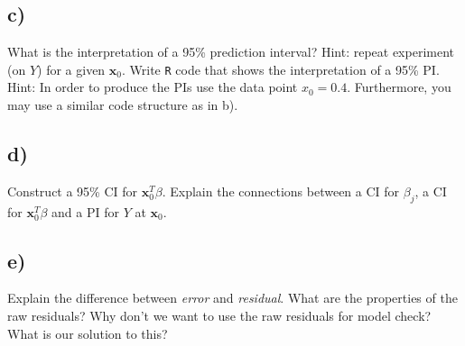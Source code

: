 \documentclass[
]{article}
\begin{document}
\subsection{c)}\label{c-1}

What is the interpretation of a 95\% prediction interval? Hint: repeat
experiment (on \(Y\)) for a given \({\boldsymbol x}_0\). Write
\texttt{R} code that shows the interpretation of a 95\% PI. Hint: In
order to produce the PIs use the data point \(x_0 = 0.4.\) Furthermore,
you may use a similar code structure as in b).

\subsection{d)}\label{d-1}

Construct a 95\% CI for \({\boldsymbol x}_0^T \beta\). Explain the
connections between a CI for \(\beta_j\), a CI for
\({\boldsymbol x}_0^T \beta\) and a PI for \(Y\) at
\({\boldsymbol x}_0\).

\subsection{e)}\label{e-1}

Explain the difference between \emph{error} and \emph{residual}. What
are the properties of the raw residuals? Why don't we want to use the
raw residuals for model check? What is our solution to this?
\end{document}
